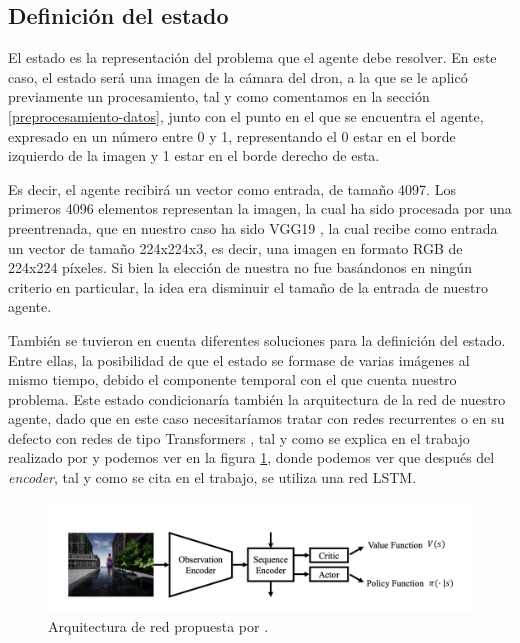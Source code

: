 

\subsection{Definición del estado}
\label{definicion-del-estado}

El estado es la representación del problema que el agente debe resolver. En este caso, el estado será una imagen de la cámara del dron, a la que se le aplicó previamente un procesamiento, tal y como comentamos en la sección \ref{preprocesamiento-datos}, junto con el punto en el que se encuentra el agente, expresado en un número entre 0 y 1, representando el 0 estar en el borde izquierdo de la imagen y 1 estar en el borde derecho de esta.
\medskip

Es decir, el agente recibirá un vector como entrada, de tamaño 4097. Los primeros 4096 elementos representan la imagen, la cual ha sido procesada por una  preentrenada, que en nuestro caso ha sido VGG19 \citep{vgg19}, la cual recibe como entrada un vector de tamaño 224x224x3, es decir, una imagen en formato RGB de 224x224 píxeles. Si bien la elección de nuestra  no fue basándonos en ningún criterio en particular, la idea era disminuir el tamaño de la entrada de nuestro agente. 
\medskip

También se tuvieron en cuenta diferentes soluciones para la definición del estado. Entre ellas, la posibilidad de que el estado se formase de varias imágenes al mismo tiempo, debido el componente temporal con el que cuenta nuestro problema. Este estado condicionaría también la arquitectura de la red de nuestro agente, dado que en este caso necesitaríamos tratar con redes recurrentes o en su defecto con redes de tipo Transformers \citep{transformers}, tal y como se explica en el trabajo realizado por \citet{luo2019end} y podemos ver en la figura \ref{fig-arquitectura-red-luo}, donde podemos ver que después del \textit{encoder}, tal y como se cita en el trabajo, se utiliza una red \acrshort{LSTM}.
\medskip

\begin{figure}[H]
    \centering
    \includegraphics[scale=0.3]{figuras/luo_network_architecture.png}
    \caption[Arquitectura de red propuesta por \citet{luo2019end}.]{Arquitectura de red propuesta por \citet{luo2019end}.}
    \label{fig-arquitectura-red-luo}
\end{figure}

